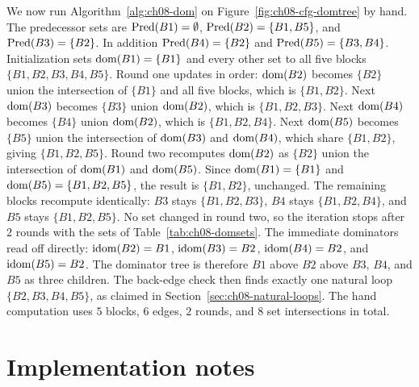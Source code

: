 We now run Algorithm~\ref{alg:ch08-dom} on Figure~\ref{fig:ch08-cfg-domtree} by hand.
The predecessor sets are $\operatorname{Pred}(B1) = \emptyset$, $\operatorname{Pred}(B2) = \{B1, B5\}$, and $\operatorname{Pred}(B3) = \{B2\}$.
In addition $\operatorname{Pred}(B4) = \{B2\}$ and $\operatorname{Pred}(B5) = \{B3, B4\}$.
Initialization sets $\operatorname{dom}(B1) = \{B1\}$ and every other set to all five blocks $\{B1, B2, B3, B4, B5\}$.
Round one updates in order: $\operatorname{dom}(B2)$ becomes $\{B2\}$ union the intersection of $\{B1\}$ and all five blocks, which is $\{B1, B2\}$.
Next $\operatorname{dom}(B3)$ becomes $\{B3\}$ union $\operatorname{dom}(B2)$, which is $\{B1, B2, B3\}$.
Next $\operatorname{dom}(B4)$ becomes $\{B4\}$ union $\operatorname{dom}(B2)$, which is $\{B1, B2, B4\}$.
Next $\operatorname{dom}(B5)$ becomes $\{B5\}$ union the intersection of $\operatorname{dom}(B3)$ and $\operatorname{dom}(B4)$, which share $\{B1, B2\}$, giving $\{B1, B2, B5\}$.
Round two recomputes $\operatorname{dom}(B2)$ as $\{B2\}$ union the intersection of $\operatorname{dom}(B1)$ and $\operatorname{dom}(B5)$.
Since $\operatorname{dom}(B1) = \{B1\}$ and $\operatorname{dom}(B5) = \{B1, B2, B5\}$, the result is $\{B1, B2\}$, unchanged.
The remaining blocks recompute identically: $B3$ stays $\{B1, B2, B3\}$, $B4$ stays $\{B1, B2, B4\}$, and $B5$ stays $\{B1, B2, B5\}$.
No set changed in round two, so the iteration stops after $2$ rounds with the sets of Table~\ref{tab:ch08-domsets}.
The immediate dominators read off directly: $\operatorname{idom}(B2) = B1$, $\operatorname{idom}(B3) = B2$, $\operatorname{idom}(B4) = B2$, and $\operatorname{idom}(B5) = B2$.
The dominator tree is therefore $B1$ above $B2$ above $B3$, $B4$, and $B5$ as three children.
The back-edge check then finds exactly one natural loop $\{B2, B3, B4, B5\}$, as claimed in Section~\ref{sec:ch08-natural-loops}.
The hand computation uses $5$ blocks, $6$ edges, $2$ rounds, and $8$ set intersections in total.

\section{Implementation notes}
\label{sec:ch08-implementation}

